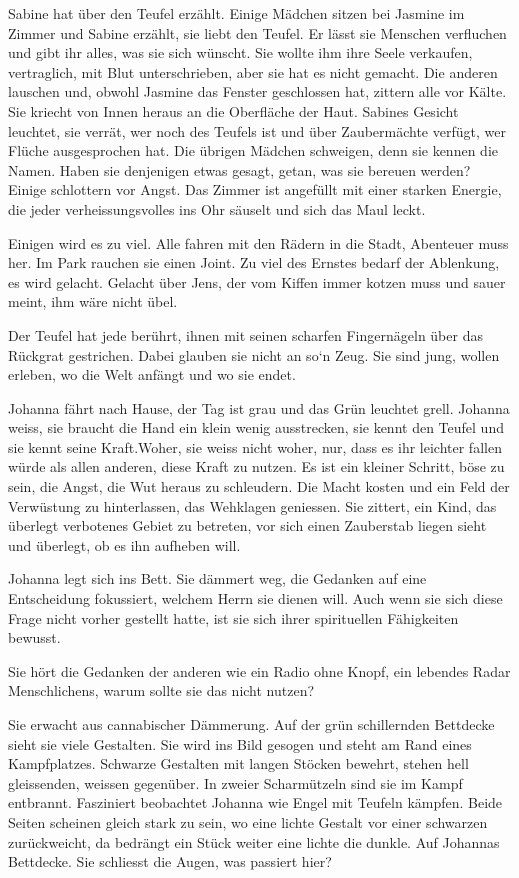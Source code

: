 \documentclass[10pt,titlepage,a5paper]{book}
\begin{document}
Sabine hat über den Teufel erzählt. Einige Mädchen sitzen bei Jasmine im Zimmer und Sabine erzählt, sie liebt den Teufel. Er lässt sie Menschen verfluchen und gibt ihr alles, was sie sich wünscht. Sie wollte ihm ihre Seele verkaufen, vertraglich, mit Blut unterschrieben, aber sie hat es nicht gemacht. Die anderen lauschen und, obwohl Jasmine das Fenster geschlossen hat, zittern alle vor Kälte. Sie kriecht von Innen heraus an die Oberfläche der Haut. Sabines Gesicht leuchtet, sie verrät, wer noch des Teufels ist und über Zaubermächte verfügt, wer Flüche ausgesprochen hat. Die übrigen Mädchen schweigen, denn sie kennen die Namen. Haben sie denjenigen etwas gesagt, getan,  was sie bereuen werden? Einige schlottern vor Angst. Das Zimmer ist angefüllt mit einer starken Energie, die jeder verheissungsvolles ins Ohr säuselt und sich das Maul leckt.

Einigen wird es zu viel. Alle fahren mit den Rädern in die Stadt, Abenteuer muss her. Im Park rauchen sie einen Joint. Zu viel des Ernstes bedarf der Ablenkung, es wird gelacht. Gelacht über Jens, der vom Kiffen immer kotzen muss und sauer meint, ihm wäre nicht übel.

Der Teufel hat jede berührt, ihnen mit seinen scharfen Fingernägeln über das Rückgrat gestrichen. Dabei glauben sie nicht an so`n Zeug. Sie sind jung, wollen erleben, wo die Welt anfängt und wo sie endet.

Johanna fährt nach Hause, der Tag ist grau und das Grün leuchtet grell. Johanna weiss, sie braucht die Hand ein klein wenig ausstrecken, sie kennt den Teufel und sie kennt seine Kraft.Woher, sie weiss nicht woher, nur, dass es ihr leichter fallen würde als allen anderen, diese Kraft zu nutzen. Es ist ein kleiner Schritt, böse zu sein, die Angst, die Wut heraus zu schleudern. Die Macht kosten und ein Feld der Verwüstung zu hinterlassen, das Wehklagen geniessen. Sie zittert, ein Kind, das überlegt verbotenes Gebiet zu betreten, vor sich einen Zauberstab liegen sieht und überlegt, ob es ihn aufheben will.

Johanna legt sich ins Bett. Sie dämmert weg, die Gedanken auf eine Entscheidung fokussiert, welchem Herrn sie dienen will. Auch wenn sie sich diese Frage nicht vorher gestellt hatte, ist sie sich ihrer spirituellen Fähigkeiten bewusst.

Sie hört die Gedanken der anderen wie ein Radio ohne Knopf, ein lebendes Radar Menschlichens, warum sollte sie das nicht nutzen?

Sie erwacht aus cannabischer Dämmerung. Auf der grün schillernden Bettdecke sieht sie viele Gestalten. Sie wird ins Bild gesogen und steht am Rand eines Kampfplatzes. Schwarze Gestalten mit langen Stöcken bewehrt, stehen hell gleissenden, weissen gegenüber. In zweier Scharmützeln sind sie im Kampf entbrannt. Fasziniert beobachtet Johanna wie Engel mit Teufeln kämpfen. Beide Seiten scheinen gleich stark zu sein, wo eine lichte Gestalt vor einer schwarzen zurückweicht, da bedrängt ein Stück weiter eine lichte die dunkle. Auf Johannas Bettdecke. Sie schliesst die Augen, was passiert hier? 
\end{document}
